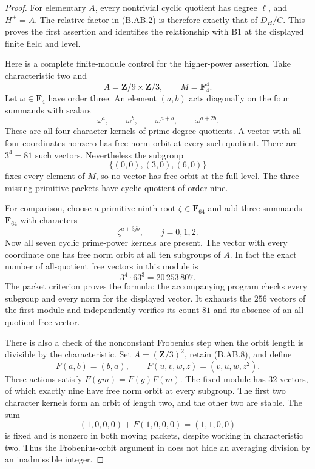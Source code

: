 \begin{proof}
For elementary $A$, every nontrivial cyclic quotient has degree
$\ell$, and $H^+=A$. The relative factor in (B.AB.2) is
therefore exactly that of $D_H/C$. This proves the first
assertion and identifies the relationship with B1 at the
displayed finite field and level.

Here is a complete finite-module control for the higher-power
assertion. Take characteristic two and
\[
        A=\mathbf Z/9\times\mathbf Z/3,
                     \qquad M=\mathbf F_4^4.
\]
Let $\omega\in\mathbf F_4$ have order three. An element
$(a,b)$ acts diagonally on the four summands with scalars
\[
          \omega^a,\qquad\omega^b,\qquad
          \omega^{a+b},\qquad\omega^{a+2b}.                    \tag{B.AB.8}
\]
These are all four character kernels of prime-degree
quotients. A vector with all four coordinates nonzero has
free norm orbit at every such quotient. There are $3^4=81$
such vectors. Nevertheless the subgroup
\[
                   \{(0,0),(3,0),(6,0)\}
\]
fixes every element of $M$, so no vector has free orbit at
the full level. The three missing primitive packets have
cyclic quotient of order nine.

For comparison, choose a primitive ninth root
$\zeta\in\mathbf F_{64}$ and add three summands
$\mathbf F_{64}$ with characters
\[
                \zeta^{a+3jb},\qquad j=0,1,2.
\]
Now all seven cyclic prime-power kernels are present.
The vector with every coordinate one has free norm orbit
at all ten subgroups of $A$. In fact the exact number of
all-quotient free vectors in this module is
\[
                       3^4\cdot63^3=20\,253\,807.
\]
The packet criterion proves the formula; the accompanying
program checks every subgroup and every norm for the displayed
vector. It exhausts the $256$ vectors of the first module and
independently verifies its count $81$ and its absence of an
all-quotient free vector.

There is also a check of the nonconstant Frobenius step when
the orbit length is divisible by the characteristic. Set
$A=(\mathbf Z/3)^2$, retain (B.AB.8), and define
\[
 F(a,b)=(b,a),\qquad
             F(u,v,w,z)=(v,u,w,z^2).
\]
These actions satisfy $F(gm)=F(g)F(m)$. The fixed module
has $32$ vectors, of which exactly nine have free norm orbit
at every subgroup. The first two character kernels form an
orbit of length two, and the other two are stable. The sum
\[
                  (1,0,0,0)+F(1,0,0,0)=(1,1,0,0)
\]
is fixed and is nonzero in both moving packets, despite
working in characteristic two. Thus the Frobenius-orbit
argument in  does not hide an averaging
division by an inadmissible integer.


\end{proof}
